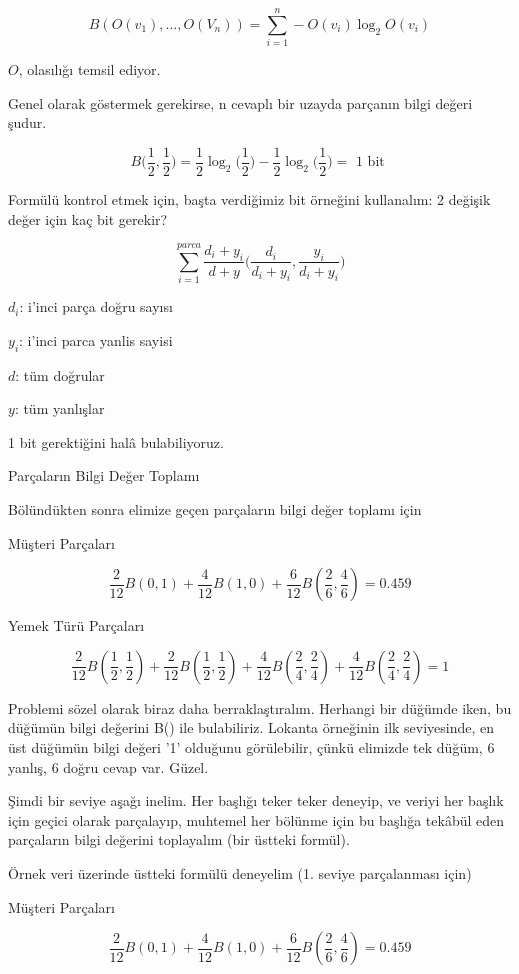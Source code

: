 \documentclass[12pt,fleqn]{article}\usepackage{../../common}
\begin{document}
$$ B(O(v_1),...,O(V_n)) = \sum_{i=1}^{n} -O(v_i)\log_2O(v_i) $$

$O$, olasılığı temsil ediyor. 

Genel olarak göstermek gerekirse, n cevaplı bir uzayda parçanın bilgi
değeri şudur. 

$$ B \bigg(\frac{1}{2}, \frac{1}{2} \bigg) = 
\frac{1}{2}\log_2 \bigg(\frac{1}{2} \bigg) 
- \frac{1}{2}\log_2 \bigg(\frac{1}{2} \bigg) = \textrm { 1 bit }
 $$

Formülü kontrol etmek için, başta verdiğimiz bit örneğini kullanalım: 2
değişik değer için kaç bit gerekir?

$$ \sum_{i=1}^{parca} \frac{d_i + y_i}{d+y} 
\bigg( \frac{d_i}{d_i+y_i}, \frac{y_i}{d_i+y_i} \bigg)
$$

$d_i$: i'inci parça doğru sayısı

$y_i$: i'inci parca yanlis sayisi

$d$: tüm doğrular

$y$: tüm yanlışlar

1 bit gerektiğini halâ bulabiliyoruz.

Parçaların Bilgi Değer Toplamı

Bölündükten sonra elimize geçen parçaların bilgi değer toplamı için 

Müşteri Parçaları

$$  
\frac{2}{12}B(0,1) + \frac{4}{12}B(1,0) + \frac{6}{12} B(\frac{2}{6},
\frac{4}{6}) = 0.459
$$

Yemek Türü Parçaları

$$ 
\frac{2}{12}B(\frac{1}{2},\frac{1}{2}) + 
\frac{2}{12}B(\frac{1}{2},\frac{1}{2}) + 
\frac{4}{12}B(\frac{2}{4},\frac{2}{4}) + 
\frac{4}{12}B(\frac{2}{4},\frac{2}{4}) 
= 1
 $$

Problemi sözel olarak biraz daha berraklaştıralım. Herhangi bir düğümde
iken, bu düğümün bilgi değerini B() ile bulabiliriz. Lokanta örneğinin ilk
seviyesinde, en üst düğümün bilgi değeri '1' olduğunu görülebilir, çünkü
elimizde tek düğüm, 6 yanlış, 6 doğru cevap var. Güzel.

Şimdi bir seviye aşağı inelim. Her başlığı teker teker deneyip, ve veriyi
her başlık için geçici olarak parçalayıp, muhtemel her bölünme için bu
başlığa tekâbül eden parçaların bilgi değerini toplayalım (bir üstteki
formül).

Örnek veri üzerinde üstteki formülü deneyelim (1. seviye parçalanması için)

Müşteri Parçaları

$$ 
\frac{2}{12}B(0,1) +
\frac{4}{12}B(1,0) +
\frac{6}{12}B(\frac{2}{6}, \frac{4}{6}) = 0.459
 $$
\end{document}
